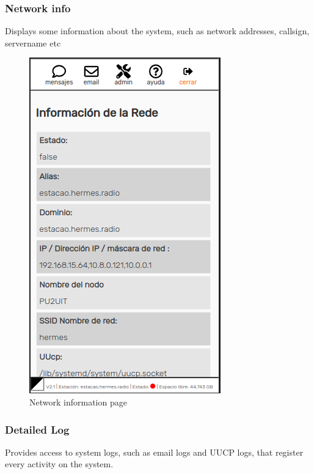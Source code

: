 \documentclass[11pt,a4paper]{article}
\begin{document}
\subsubsection{Network info} 
\label{gui_net_info}

Displays some information about the system, such as network addresses, callsign, servername etc
     \begin{figure}[H]
     \vspace{-10pt}
    \centering
    \includegraphics[width=0.5\columnwidth]{screenshots/frontend/es/networkinfo.png}
    \caption{Network information page}
    \label{fig:netinfo}
  
    \end{figure}
    
 


    
\subsubsection{Detailed Log}
Provides access to system logs, such as email logs and UUCP logs, that register every activity on the system.
    
\end{document}
